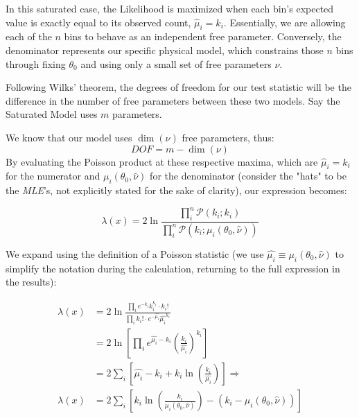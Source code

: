 In this saturated case, the Likelihood is maximized when each bin's expected value is exactly equal to its observed count, $\hat{\mu}_{i} = k_i$. Essentially, we are allowing each of the $n$ bins to behave as an independent free parameter. Conversely, the denominator represents our specific physical model, which constrains those $n$ bins through fixing $\theta_0$ and using only a small set of free parameters $\nu$.

Following Wilks' theorem, the degrees of freedom for our test statistic will be the difference in the number of free parameters between these two models. Say the Saturated Model uses $m$ parameters\sidenotemark{}.

We know that our model uses $\dim(\nu)$ free parameters, thus:
	\[
	DOF = m - \dim(\nu)
	\]
By evaluating the Poisson product at these respective maxima, which are $\hat{\mu}_{i} = k_i$ for the numerator and $\mu_i(\theta_0, \hat\nu)$ for the denominator (consider the "hats" to be the \emph{MLE}'s, not explicitly stated for the sake of clarity), our expression becomes:

	\[
	\lambda(x) = 2\ln\frac{\prod_i^n \mathcal{P}\left(k_i;k_i\right)}{\prod_i^n \mathcal{P}\left(k_i;\mu_i(\theta_0,\hat{\nu})\right)}
	\]

We expand using the definition of a Poisson statistic (we use $\hat{\mu_i}\equiv\mu_i(\theta_0,\hat{\nu})$ to simplify the notation during the calculation, returning to the full expression in the results):

\begin{align*}
	\lambda(x) &= 2\ln\frac{\prod_i e^{-k_i} k_i^{k_i} \cdot k_i!}{\prod_ik_i! \cdot e^{-\hat{\mu_i}} \hat{\mu_i}^{k_i}} \\
	&= 2\ln\left[\prod_i e^{\hat{\mu_i}-k_i} \left(\frac{k_i}{\hat{\mu_i}}\right)^{k_i}\right] \\
	&= 2\sum_i\left[\hat{\mu_i}-k_i+k_i\ln\left(\frac{k_i}{\hat{\mu_i}}\right)\right] \Rightarrow \\
	\lambda(x) &= 2\sum_i\left[k_i\ln\left(\frac{k_i}{\mu_i(\theta_0,\hat{\nu})}\right)-\left(k_i-\mu_i(\theta_0,\hat{\nu})\right)\right]
\end{align*}

